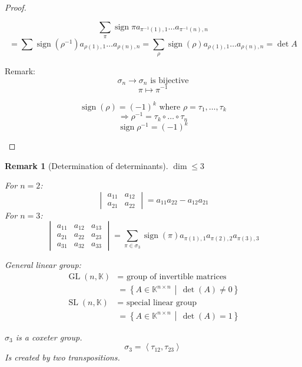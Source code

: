 \documentclass[a4paper,landscape,twocolumn]{article}
\newcommand\setdef[2]{\left\{#1\,\middle|\,#2\right\}}
\newcommand\functional[1]{\left\langle{#1}\right\rangle}
\newtheorem{rem}{Remark}
\DeclareMathOperator\sign{sign}
\begin{document}
\begin{proof}
\begin{enumerate}
      \[ \sum_{\pi} \sign{\pi} a_{\pi^{-1}(1),1} \ldots a_{\pi^{-1}(n),n} \]
      \[
        = \sum \sign(\rho^{-1}) a_{\rho(1),1} \ldots a_{\rho(n),n}
        = \sum_{\rho} \sign(\rho) a_{\rho(1),1} \ldots a_{\rho(n),n}
        = \det{A}
      \]

      Remark:
      \[ \sigma_n \to \sigma_n \text{ is bijective} \]
      \[ \pi \mapsto \pi^{-1} \]

      \[ \sign(\rho) = (-1)^k \text{ where } \rho = \tau_1, \ldots, \tau_k \]
      \[ \Rightarrow \rho^{-1} = \tau_k \circ \ldots \circ \tau_n \]
      \[ \sign{\rho^{-1}} = (-1)^k \]
  \end{enumerate}
\end{proof}

\begin{rem}[Determination of determinants]
  \label{rem-7.31}
  $\dim \leq 3$

  For $n=2$:
  \[ \begin{vmatrix} a_{11} & a_{12} \\ a_{21} & a_{22} \end{vmatrix} = a_{11} a_{22} - a_{12} a_{21} \]
  For $n = 3$:
  \[
    \begin{vmatrix} a_{11} & a_{12} & a_{13} \\ a_{21} & a_{22} & a_{23} \\ a_{31} & a_{32} & a_{33} \end{vmatrix}
    = \sum_{\pi \in \sigma_3} \sign(\pi) a_{\pi(1),1} a_{\pi(2),2} a_{\pi(3),3}
  \]

  General linear group:
  \begin{align*}
    \operatorname{GL}(n,\mathbb K)
      &= \text{ group of invertible matrices} \\
      &= \setdef{A \in \mathbb K^{n \times n}}{\det(A) \neq 0} \\
    \operatorname{SL}(n, \mathbb K)
      &= \text{ special linear group} \\
      &= \setdef{A \in \mathbb K^{n \times n}}{\det(A) = 1}
  \end{align*}

  $\sigma_3$ is a coxeter group.
  \[ \sigma_3 = \functional{\tau_{12}, \tau_{23}} \]
  Is created by two transpositions.


\end{rem}
\end{document}
